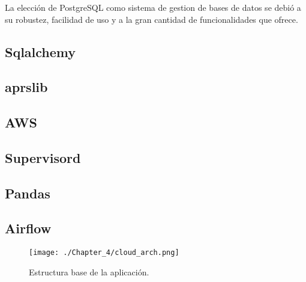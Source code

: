 La elección de PostgreSQL como sistema de gestion de bases de datos se debió a su robustez, facilidad de uso y a la gran cantidad de funcionalidades que ofrece.

\subsection{Sqlalchemy}
\subsection{aprslib}
\subsection{AWS}
\subsection{Supervisord}
\subsection{Pandas}
\subsection{Airflow}


\begin{figure}[h]
    \centering
    \texttt{[image: ./Chapter\_4/cloud\_arch.png]}
    \caption{Estructura base de la aplicación.}
    \label{fig:cloud-architecture}
\end{figure}
